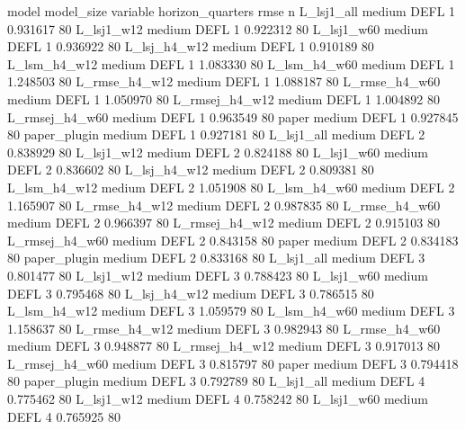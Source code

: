          model model_size variable  horizon_quarters     rmse  n
    L_lsj1_all     medium     DEFL                 1 0.931617 80
    L_lsj1_w12     medium     DEFL                 1 0.922312 80
    L_lsj1_w60     medium     DEFL                 1 0.936922 80
  L_lsj_h4_w12     medium     DEFL                 1 0.910189 80
  L_lsm_h4_w12     medium     DEFL                 1 1.083330 80
  L_lsm_h4_w60     medium     DEFL                 1 1.248503 80
 L_rmse_h4_w12     medium     DEFL                 1 1.088187 80
 L_rmse_h4_w60     medium     DEFL                 1 1.050970 80
L_rmsej_h4_w12     medium     DEFL                 1 1.004892 80
L_rmsej_h4_w60     medium     DEFL                 1 0.963549 80
         paper     medium     DEFL                 1 0.927845 80
  paper_plugin     medium     DEFL                 1 0.927181 80
    L_lsj1_all     medium     DEFL                 2 0.838929 80
    L_lsj1_w12     medium     DEFL                 2 0.824188 80
    L_lsj1_w60     medium     DEFL                 2 0.836602 80
  L_lsj_h4_w12     medium     DEFL                 2 0.809381 80
  L_lsm_h4_w12     medium     DEFL                 2 1.051908 80
  L_lsm_h4_w60     medium     DEFL                 2 1.165907 80
 L_rmse_h4_w12     medium     DEFL                 2 0.987835 80
 L_rmse_h4_w60     medium     DEFL                 2 0.966397 80
L_rmsej_h4_w12     medium     DEFL                 2 0.915103 80
L_rmsej_h4_w60     medium     DEFL                 2 0.843158 80
         paper     medium     DEFL                 2 0.834183 80
  paper_plugin     medium     DEFL                 2 0.833168 80
    L_lsj1_all     medium     DEFL                 3 0.801477 80
    L_lsj1_w12     medium     DEFL                 3 0.788423 80
    L_lsj1_w60     medium     DEFL                 3 0.795468 80
  L_lsj_h4_w12     medium     DEFL                 3 0.786515 80
  L_lsm_h4_w12     medium     DEFL                 3 1.059579 80
  L_lsm_h4_w60     medium     DEFL                 3 1.158637 80
 L_rmse_h4_w12     medium     DEFL                 3 0.982943 80
 L_rmse_h4_w60     medium     DEFL                 3 0.948877 80
L_rmsej_h4_w12     medium     DEFL                 3 0.917013 80
L_rmsej_h4_w60     medium     DEFL                 3 0.815797 80
         paper     medium     DEFL                 3 0.794418 80
  paper_plugin     medium     DEFL                 3 0.792789 80
    L_lsj1_all     medium     DEFL                 4 0.775462 80
    L_lsj1_w12     medium     DEFL                 4 0.758242 80
    L_lsj1_w60     medium     DEFL                 4 0.765925 80
